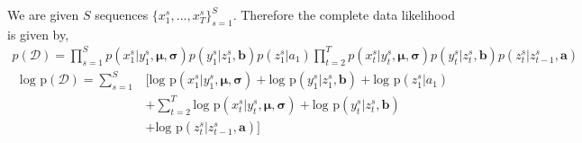 \documentclass[11pt]{article}
\renewcommand{\vec}[1]{\mathbf{#1}}
\begin{document}
We are given $S$ sequences ${\{x_1^s, \dots, x_T^s\}_{s=1}^S}$. Therefore the complete data likelihood is given by, 
\begin{align}
     p(\mathcal{D}) = \prod_{s=1}^S p(x^s_1|y^s_1, \vec{\mu}, \vec{\sigma})p(y^s_1|z^s_1, \vec{b})p(z^s_1|a_1) \prod_{t=2}^T p(x^s_t|y^s_t, \vec{\mu}, \vec{\sigma})p(y^s_t|z^s_t, \vec{b})p(z^s_t | z^s_{t-1}, \vec{a})
\end{align}
\begin{align}
        \text{log p}(\mathcal{D}) = \sum_{s=1}^S &\Bigg[ \text{log p}(x^s_1|y^s_1, \vec{\mu}, \vec{\sigma}) +  \text{log p}(y^s_1|z^s_1, \vec{b}) + \text{log p}(z^s_1 | a_1) \nonumber\\
    &+ \sum_{t=2}^T \text{log p}(x^s_t|y^s_t, \vec{\mu}, \vec{\sigma}) +  \text{log p}(y^s_t|z^s_t, \vec{b}) \nonumber\\
    &+ \text{log p}(z^s_t | z^s_{t-1}, \vec{a})\Bigg]
\end{align}
\end{document}
